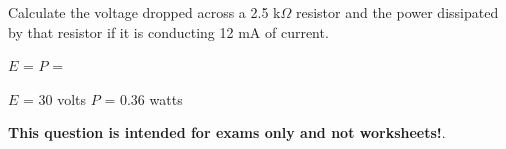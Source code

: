 

Calculate the voltage dropped across a 2.5 k$\Omega$ resistor and the power dissipated by that resistor if it is conducting 12 mA of current.

\vskip 10pt

$E$ = \hskip 150pt $P$ =







$E$ = 30 volts \hskip 100pt $P$ = 0.36 watts







{\bf This question is intended for exams only and not worksheets!}.



